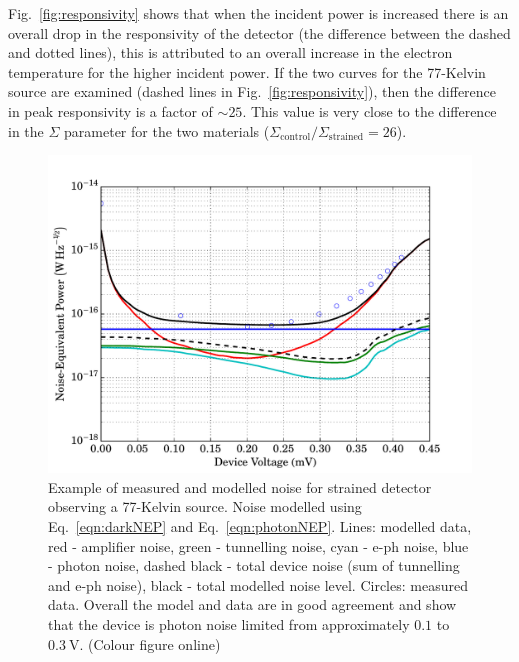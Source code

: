 \documentclass[final]{svjour2}
\begin{document}
\par
Fig.~\ref{fig:responsivity} shows that when the incident power is increased there is an overall drop in the responsivity of the detector (the difference between the dashed and dotted lines), this is attributed to an overall increase in the electron temperature for the higher incident power. If the two curves for the 77-Kelvin source are examined (dashed lines in Fig.~\ref{fig:responsivity}), then the difference in peak responsivity is a factor of $\sim 25$. This value is very close to the difference in the $\varSigma$ parameter for the two materials ($\varSigma_{\mathrm{control}}/\varSigma_{\mathrm{strained}} = 26$).
\par 
\begin{figure}[htb]
\centering
\includegraphics[width = 0.6\columnwidth]{02_strained_SiCEB_noiseModel_77}
\caption{Example of measured and modelled noise for strained detector observing a 77-Kelvin source. Noise modelled using Eq.~\ref{eqn:darkNEP} and Eq.~\ref{eqn:photonNEP}. Lines: modelled data, red - amplifier noise, green - tunnelling noise, cyan - e-ph noise, blue - photon noise, dashed black - total device noise (sum of tunnelling and e-ph noise), black - total modelled noise level. Circles: measured data. Overall the model and data are in good agreement and show that the device is photon noise limited from approximately $0.1$ to $0.3~\mathrm{V}$. (Colour figure online)
\label{fig:noise}}
\end{figure}
\end{document}
